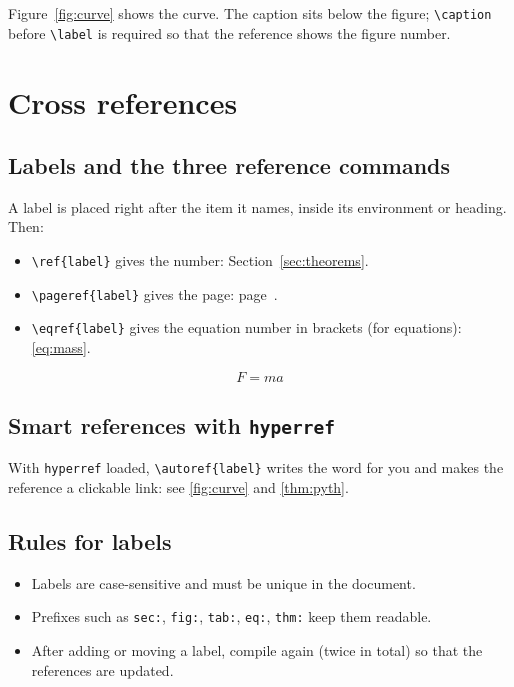 \documentclass[11pt,a4paper]{article}
\theoremstyle{plain}                         %
\theoremstyle{definition}                    %
\theoremstyle{remark}                        %
\begin{document}
Figure~\ref{fig:curve} shows the curve. The caption sits below the
figure; \verb|\caption| before \verb|\label| is required so that the
reference shows the figure number.

\section{Cross references}

\subsection{Labels and the three reference commands}

A label is placed right after the item it names, inside its
environment or heading. Then:
\begin{itemize}
  \item \verb|\ref{label}| gives the number: Section~\ref{sec:theorems}.
  \item \verb|\pageref{label}| gives the page: page~\pageref{sec:theorems}.
  \item \verb|\eqref{label}| gives the equation number in brackets (for
    equations): \eqref{eq:mass}.
\end{itemize}

\begin{equation}\label{eq:mass}
  F = ma
\end{equation}

\subsection{Smart references with \texttt{hyperref}}

With \texttt{hyperref} loaded, \verb|\autoref{label}| writes the word
for you and makes the reference a clickable link: see
\autoref{fig:curve} and \autoref{thm:pyth}.

\subsection{Rules for labels}

\begin{itemize}
  \item Labels are case-sensitive and must be unique in the document.
  \item Prefixes such as \texttt{sec:}, \texttt{fig:}, \texttt{tab:},
    \texttt{eq:}, \texttt{thm:} keep them readable.
  \item After adding or moving a label, compile again (twice in total)
    so that the references are updated.
\end{itemize}
\end{document}
